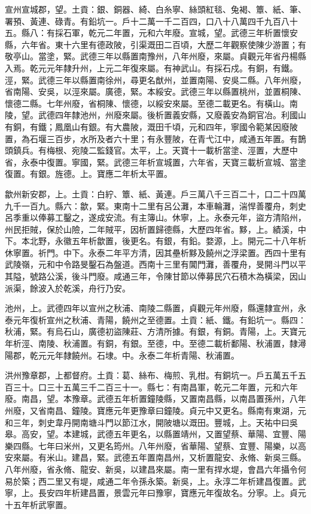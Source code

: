 \begin{pinyinscope}
 宣州宣城郡，望。土貢：銀、銅器、綺、白糸寧、絲頭紅毯、兔褐、簟、紙、筆、署預、黃連、碌青。有鉛坑一。戶十二萬一千二百四，口八十八萬四千九百八十五。縣八：有採石軍，乾元二年置，元和六年廢。宣城，望。武德三年析置懷安縣，六年省。東十六里有德政陂，引渠溉田二百頃，大歷二年觀察使陳少游置；有敬亭山。當塗，緊。武德三年以縣置南豫州，八年州廢，來屬。貞觀元年省丹楊縣入焉。乾元元年隸升州，上元二年復來屬。有神武山。有採石戍。有銅，有鐵。涇，緊。武德三年以縣置南徐州，尋更名猷州，並置南陽、安吳二縣。八年州廢，省南陽、安吳，以涇來屬。廣德，緊。本綏安。武德三年以縣置桃州，並置桐陳、懷德二縣。七年州廢，省桐陳、懷德，以綏安來屬。至德二載更名。有橫山。南陵，望。武德四年隸池州，州廢來屬。後析置義安縣，又廢義安為銅官冶。利國山有銅，有鐵；鳳凰山有銀。有大農陂，溉田千頃，元和四年，寧國令範某因廢陂置，為石堰三百步，水所及者六十里；有永豐陂，在青弋江中，咸通五年置。有鵲頭鎮兵。有梅根、宛陵二監錢官。太平，上。天寶十一載析當塗、涇置，大歷中省，永泰中復置。寧國，緊。武德三年析宣城置，六年省，天寶三載析宣城、當塗復置。有銀。旌德。上。寶應二年析太平置。



 歙州新安郡，上。土貢：白紵、簟、紙、黃連。戶三萬八千三百二十，口二十四萬九千一百九。縣六：歙，緊。東南十二里有呂公灘，本車輪灘，湍悍善覆舟，刺史呂季重以俸募工鑿之，遂成安流。有主簿山。休寧，上。永泰元年，盜方清陷州，州民拒賊，保於山險，二年賊平，因析置歸德縣，大歷四年省。黟，上。績溪，中下。本北野，永徽五年析歙置，後更名。有銀，有鉛。婺源，上。開元二十八年析休寧置。祈門。中下。永泰二年平方清，因其壘析黟及饒州之浮梁置。西四十里有武陵嶺，元和中令路旻鑿石為盤道。西南十三里有閶門灘，善覆舟，旻開斗門以平其隘，號路公溪，後斗門廢。咸通三年，令陳甘節以俸募民穴石積木為橫梁，因山派渠，餘波入於乾溪，舟行乃安。



 池州，上。武德四年以宣州之秋浦、南陵二縣置，貞觀元年州廢，縣還隸宣州，永泰元年復析宣州之秋浦、青陽，饒州之至德置。土貢：紙、鐵。有鉛坑一。縣四：秋浦，緊。有烏石山，廣德初盜陳莊、方清所據。有銀，有銅。青陽，上。天寶元年析涇、南陵、秋浦置。有銅，有銀。至德，中。至德二載析鄱陽、秋浦置，隸潯陽郡，乾元元年隸饒州。石埭。中。永泰二年析青陽、秋浦置。



 洪州豫章郡，上都督府。土貢：葛、絲布、梅煎、乳柑。有銅坑一。戶五萬五千五百三十。口三十五萬三千二百三十一。縣七：有南昌軍，乾元二年置，元和六年廢。南昌，望。本豫章。武德五年析置鐘陵縣，又置南昌縣，以南昌置孫州，八年州廢，又省南昌、鐘陵。寶應元年更豫章曰鐘陵。貞元中又更名。縣南有東湖，元和三年，刺史韋丹開南塘斗門以節江水，開陂塘以溉田。豐城，上。天祐中曰吳皋。高安，望。本建城，武德五年更名，以縣置靖州，又置望蔡、華陽、宜豐、陽樂四縣。七年曰米州，又更名筠州。八年州廢，省華陽、望蔡、宜豐、陽樂，以高安來屬。有米山。建昌，緊。武德五年置南昌州，又析置龍安、永脩、新吳三縣。八年州廢，省永脩、龍安、新吳，以建昌來屬。南一里有捍水堤，會昌六年攝令何易於築；西二里又有堤，咸通二年令孫永築。新吳，上。永淳二年析建昌復置。武寧，上。長安四年析建昌置，景雲元年曰豫寧，寶應元年復故名。分寧。上。貞元十五年析武寧置。




\end{pinyinscope}
